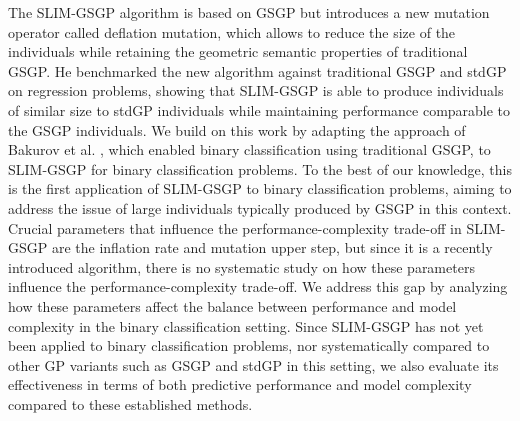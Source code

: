 \documentclass[manuscript, review, anonymous]{acmart} %
\begin{document}
The SLIM-GSGP algorithm is based on GSGP but introduces a new mutation operator called deflation mutation,
which allows to reduce the size of the individuals while retaining the geometric semantic properties of traditional GSGP.
He benchmarked the new algorithm against traditional GSGP and stdGP on regression problems, 
showing that SLIM-GSGP is able to produce individuals of similar size to stdGP 
individuals while maintaining performance comparable to the GSGP individuals.
We build on this work by adapting the approach of Bakurov et al. \cite{Bakurov2019}, 
which enabled binary classification using traditional GSGP, to SLIM-GSGP for binary classification problems.
To the best of our knowledge, this is the first application of SLIM-GSGP to binary classification problems, 
aiming to address the issue of large individuals typically produced by GSGP in this context.
Crucial parameters that influence the performance-complexity trade-off in SLIM-GSGP are the inflation rate and mutation upper step,
but since it is a recently introduced algorithm, 
there is no systematic study on how these parameters influence the performance-complexity trade-off.
We address this gap by analyzing how these parameters affect the balance between performance and model complexity 
in the binary classification setting.
Since SLIM-GSGP has not yet been applied to binary classification problems, nor systematically compared to other GP 
variants such as GSGP and stdGP in this setting, 
we also evaluate its effectiveness in terms of both predictive performance and model complexity compared to these established methods.
\end{document}
